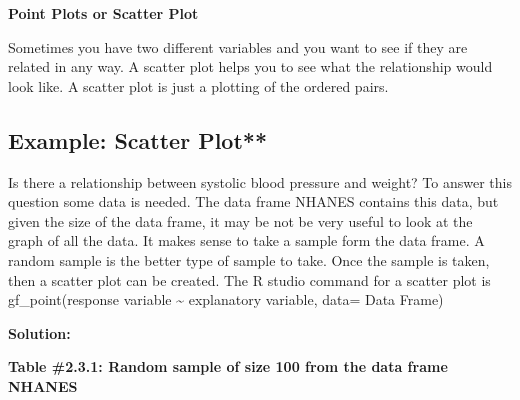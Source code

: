 \documentclass[]{book}
\newenvironment{Shaded}{\begin{snugshade}}{\end{snugshade}}
\newcommand{\DataTypeTok}[1]{\textcolor[rgb]{0.13,0.29,0.53}{#1}}
\newcommand{\DecValTok}[1]{\textcolor[rgb]{0.00,0.00,0.81}{#1}}
\newcommand{\KeywordTok}[1]{\textcolor[rgb]{0.13,0.29,0.53}{\textbf{#1}}}
\newcommand{\NormalTok}[1]{#1}
\newcommand{\OperatorTok}[1]{\textcolor[rgb]{0.81,0.36,0.00}{\textbf{#1}}}
\newcommand{\StringTok}[1]{\textcolor[rgb]{0.31,0.60,0.02}{#1}}
\begin{document}
\textbf{Point Plots or Scatter Plot}

Sometimes you have two different variables and you want to see if they
are related in any way. A scatter plot helps you to see what the
relationship would look like. A scatter plot is just a plotting of the
ordered pairs.

\hypertarget{example-scatter-plot}{%
\subsection{Example: Scatter Plot**}\label{example-scatter-plot}}

Is there a relationship between systolic blood pressure and weight? To answer this question some data is needed. The data frame NHANES contains this data, but given the size of the data frame, it may be not be very useful to look at the graph of all the data. It makes sense to take a sample form the data frame. A random sample is the better type of sample to take. Once the sample is taken, then a scatter plot can be created. The R studio command for a scatter plot is gf\_point(response variable \textasciitilde{} explanatory variable, data= Data Frame)

\textbf{Solution:}

\textbf{Table \#2.3.1: Random sample of size 100 from the data frame NHANES}

\begin{Shaded}
\end{Shaded}
\end{document}
